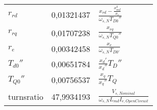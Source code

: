 \begin{longtable}[]{@{}lll@{}}
\begin{minipage}[t]{0.10\columnwidth}\raggedright
\(r_{rd}\)\strut
\end{minipage} & \begin{minipage}[t]{0.25\columnwidth}\raggedright
0,01321437\strut
\end{minipage} & \begin{minipage}[t]{0.55\columnwidth}\raggedright
\(\frac{x_{rd}-\frac{x_{md}^2}{x_e}}{\omega_{s,N}T_{D0}''}\)\strut
\end{minipage}\tabularnewline
\begin{minipage}[t]{0.10\columnwidth}\raggedright
\(r_{rq}\)\strut
\end{minipage} & \begin{minipage}[t]{0.25\columnwidth}\raggedright
0,01707238\strut
\end{minipage} & \begin{minipage}[t]{0.55\columnwidth}\raggedright
\(\frac{x_{rq}}{\omega_{s,N}T_{Q0}''}\)\strut
\end{minipage}\tabularnewline
\begin{minipage}[t]{0.10\columnwidth}\raggedright
\(r_e\)\strut
\end{minipage} & \begin{minipage}[t]{0.25\columnwidth}\raggedright
0,00342458\strut
\end{minipage} & \begin{minipage}[t]{0.55\columnwidth}\raggedright
\(\frac{x_e}{\omega_{s,N}T_{D0'}}\)\strut
\end{minipage}\tabularnewline
\begin{minipage}[t]{0.10\columnwidth}\raggedright
\(T_{d0}''\)\strut
\end{minipage} & \begin{minipage}[t]{0.25\columnwidth}\raggedright
0,00651784\strut
\end{minipage} & \begin{minipage}[t]{0.55\columnwidth}\raggedright
\(\frac{x_d'}{x_d''}T_D''\)\strut
\end{minipage}\tabularnewline
\begin{minipage}[t]{0.10\columnwidth}\raggedright
\(T_{Q0}''\)\strut
\end{minipage} & \begin{minipage}[t]{0.25\columnwidth}\raggedright
0,00756537\strut
\end{minipage} & \begin{minipage}[t]{0.55\columnwidth}\raggedright
\(\frac{x_q}{x_q''}T_Q\)\strut
\end{minipage}\tabularnewline
\begin{minipage}[t]{0.10\columnwidth}\raggedright
turnsratio\strut
\end{minipage} & \begin{minipage}[t]{0.25\columnwidth}\raggedright
47,9934193\strut
\end{minipage} & \begin{minipage}[t]{0.55\columnwidth}\raggedright
\(\frac{V_{s,Nominal}}{\omega_{s,N}L_{md}I_{e,OpenCircuit}}\)\strut
\end{minipage}\tabularnewline
\bottomrule
\end{longtable}

